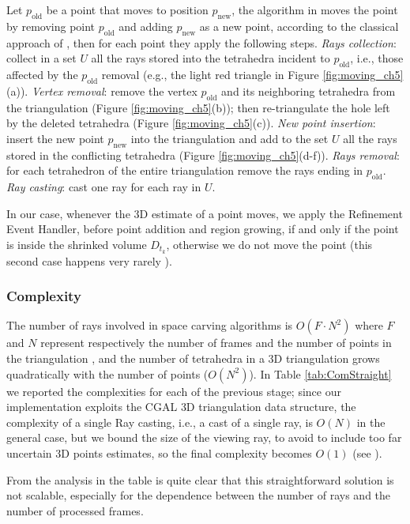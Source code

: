 Let $p_{\text{old}}$ be a point that moves to position $p_{\text{new}}$, the algorithm in \cite{lovi_et_al_11} moves the point by removing point $p_{\text{old}}$ and adding $p_{\text{new}}$ as a new point, according to the classical approach of \cite{Devillers03}, then for each point they apply the following steps. \emph{Rays collection}: collect in a set $U$ all the rays stored into the tetrahedra incident to $p_{\text{old}}$, i.e., those affected by the $p_{\text{old}}$ removal (e.g., the light red triangle in Figure \ref{fig:moving_ch5}(a)). \emph{Vertex removal}: remove the vertex $p_{\text{old}}$ and its neighboring tetrahedra from the triangulation (Figure \ref{fig:moving_ch5}(b)); then re-triangulate the hole left by the deleted tetrahedra (Figure \ref{fig:moving_ch5}(c)). \emph{New point insertion}: insert the new point $p_{\text{new}}$ into the triangulation and add to the set $U$ all the rays stored in the conflicting tetrahedra (Figure \ref{fig:moving_ch5}(d-f)). \emph{Rays removal}: for each tetrahedron of the entire triangulation remove the rays ending in $p_{\text{old}}$. \emph{Ray casting}: cast one ray for each ray in $U$.

In our case, whenever the 3D estimate of a point moves, we apply the Refinement Event Handler, before point addition and region growing, if and only if the point is inside the shrinked volume $D_{t_k}$, otherwise we do not move the point (this second case happens very rarely \cite{litvinov_lhuillier_13}).
\subsubsection{Complexity}
The number of rays involved in space carving algorithms is $O(F\cdot N^2)$ where $F$ and $N$ represent respectively the number of frames and the number of points in the triangulation \cite{lovi_et_al_11}, and the number of tetrahedra in a 3D triangulation grows quadratically with the number of points ($O(N^2)$). 
In Table \ref{tab:ComStraight} we reported the complexities for each of the previous stage; since our implementation exploits the CGAL \cite{cgal} 3D triangulation data structure, the complexity of a single Ray casting, i.e., a cast of a single ray, is $O(N)$ in the general case, but we bound the size of the viewing ray, to avoid to include too far uncertain 3D points estimates, so the final complexity becomes $O(1)$  (see \cite[p.94]{yu2013automatic}).

From the analysis in the table is quite clear that this straightforward solution is not scalable, especially for the dependence between the number of rays and the number of processed frames. 

